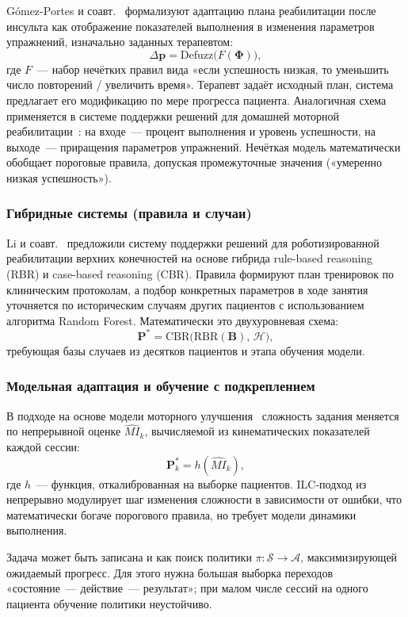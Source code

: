 G\'{o}mez-Portes и соавт.~\cite{gomez2021} формализуют адаптацию плана
реабилитации после инсульта как отображение показателей выполнения
в изменения параметров упражнений, изначально заданных терапевтом:
\[
\Delta \mathbf{p} = \mathrm{Defuzz}\bigl( F(\boldsymbol{\Phi}) \bigr),
\]
где $F$~--- набор нечётких правил вида «если успешность низкая, то
уменьшить число повторений / увеличить время». Терапевт задаёт
исходный план, система предлагает его модификацию по мере прогресса
пациента. Аналогичная схема применяется в системе поддержки решений
для домашней моторной реабилитации~\cite{castro2023}: на входе~---
процент выполнения и уровень успешности, на выходе~--- приращения
параметров упражнений. Нечёткая модель математически обобщает пороговые
правила, допуская промежуточные значения («умеренно низкая успешность»).

\subsubsection{Гибридные системы (правила и случаи)}

Li и соавт.~\cite{zhou2024} предложили систему поддержки решений для
роботизированной реабилитации верхних конечностей на основе гибрида
rule-based reasoning (RBR) и case-based reasoning (CBR). Правила
формируют план тренировок по клиническим протоколам, а подбор
конкретных параметров в ходе занятия уточняется по историческим
случаям других пациентов с использованием алгоритма Random Forest.
Математически это двухуровневая схема:
\[
\mathbf{P}^{*} = \mathrm{CBR}\bigl(\mathrm{RBR}(\mathbf{B}),\, \mathcal{H}\bigr),
\]
требующая базы случаев из десятков пациентов и этапа обучения модели.

\subsubsection{Модельная адаптация и обучение с подкреплением}

В подходе на основе модели моторного улучшения~\cite{mi2020} сложность
задания меняется по непрерывной оценке $\widehat{MI}_k$, вычисляемой
из кинематических показателей каждой сессии:
\[
\mathbf{P}^{*}_k = h(\widehat{MI}_k),
\]
где $h$~--- функция, откалиброванная на выборке пациентов. ILC-подход
из~\cite{noble2021} непрерывно модулирует шаг изменения сложности в
зависимости от ошибки, что математически богаче порогового правила,
но требует модели динамики выполнения.

Задача может быть записана и как поиск политики
$\pi: \mathcal{S} \to \mathcal{A}$, максимизирующей ожидаемый прогресс.
Для этого нужна большая выборка переходов «состояние~--- действие~---
результат»; при малом числе сессий на одного пациента обучение
политики неустойчиво.

